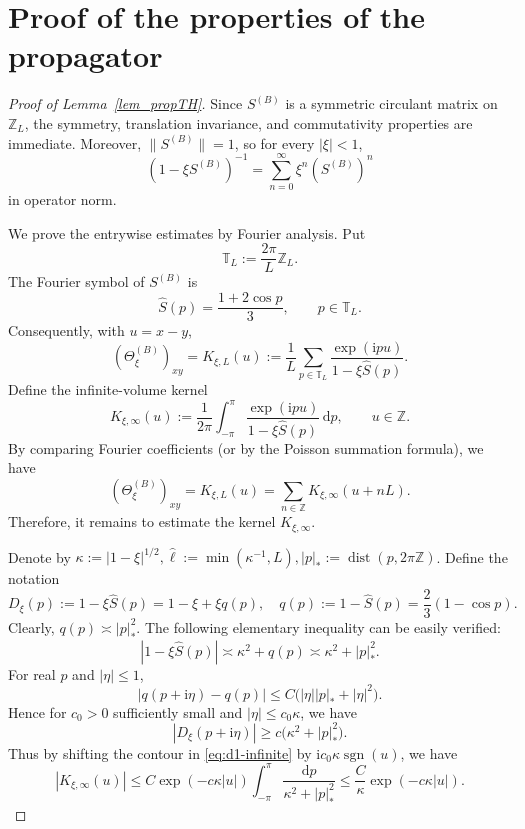 \documentclass[10pt,reqno]{article}
\newcommand{\T}{\mathbb T}
\newcommand{\ii}{\mathrm{i}}
\theoremstyle{plain} %
\theoremstyle{remark}
\numberwithin{equation}{section}
\begin{document}
 \section{Proof of the properties of the propagator}
\begin{proof}[Proof of Lemma~\ref{lem_propTH}]
Since \(S^{(B)}\) is a symmetric circulant matrix on \(\mathbb Z_L\), the
symmetry, translation invariance, and commutativity properties are immediate.
Moreover, \(\|S^{(B)}\|=1\), so for every \(|\xi|<1\),
\[
 (1-\xi S^{(B)})^{-1}
 =\sum_{n=0}^{\infty}\xi^n(S^{(B)})^n
\]
in operator norm.

We prove the entrywise estimates by Fourier analysis. Put
\[
 \T_L:=\frac{2\pi}{L}\mathbb Z_L.
\]
The Fourier symbol of \(S^{(B)}\) is
\[
 \widehat S(p)=\frac{1+2\cos p}{3},
 \qquad p\in\T_L.
\]
Consequently, with \(u=x-y\),
\begin{equation}\label{eq:d1-fourier}
 (\Theta^{(B)}_\xi)_{xy}=K_{\xi,L}(u)
 :=\frac1L\sum_{p\in\T_L}
 \frac{\exp(\ii pu)}{1-\xi\widehat S(p)}.
\end{equation}
Define the infinite-volume kernel
\begin{equation}\label{eq:d1-infinite}
 K_{\xi,\infty}(u):=\frac1{2\pi}\int_{-\pi}^{\pi}
 \frac{\exp(\ii pu)}{1-\xi\widehat S(p)}\,\mathrm dp,
 \qquad u\in\mathbb Z.
\end{equation}
By comparing Fourier coefficients (or by the Poisson summation formula), 
we have
\[
(\Theta^{(B)}_\xi)_{xy}= K_{\xi,L}(u)=\sum_{n\in\mathbb Z}K_{\xi,\infty}(u+nL).
\]
Therefore, it remains to estimate the kernel $K_{\xi,\infty}$. 

 
Denote by $\kappa:=|1-\xi|^{1/2}, 
 \widehat\ell:=\min(\kappa^{-1},L), |p|_*:=\operatorname{dist}(p,2\pi\mathbb Z)$. 
Define the notation 
\[
D_\xi(p):=1-\xi\widehat S(p)=1-\xi+\xi q(p), \quad 
 q(p):=1-\widehat S(p)=\frac23(1-\cos p).
\]
Clearly, 
\(q(p)\asymp |p|_*^2\). The following elementary inequality can be easily verified: 
\begin{equation}\label{eq:d1-ellipticity}
 |1-\xi\widehat S(p)|
 \asymp \kappa^2+q(p)
 \asymp \kappa^2+|p|_*^2.
\end{equation}
For real
\(p\) and \(|\eta|\leq1\),
\[
 |q(p+\ii\eta)-q(p)|
 \leq C\bigl(|\eta||p|_*+|\eta|^2\bigr).
\]
Hence %
for  \(c_0>0\)  sufficiently small
and  $|\eta|\leq c_0\kappa$,  we have 
\begin{equation}\label{eq:d1-shifted-ellipticity}
 |D_\xi(p+\ii\eta)|
 \geq c\bigl(\kappa^2+|p|_*^2\bigr).
\end{equation}
Thus  by  shifting the contour in \eqref{eq:d1-infinite} by
\(\ii c_0\kappa\operatorname{sgn}(u)\), we have 
\begin{equation}\label{eq:d1-infinite-decay}
 |K_{\xi,\infty}(u)|
 \leq C\exp(-c\kappa|u|)
 \int_{-\pi}^{\pi}\frac{\mathrm dp}{\kappa^2+|p|_*^2}
 \leq \frac{C}{\kappa}\exp(-c\kappa|u|).
\end{equation}
 


\end{proof}
\end{document}
